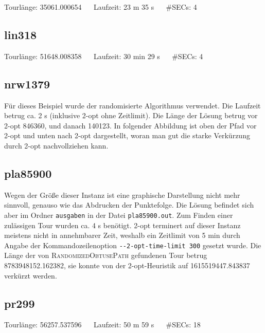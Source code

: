 \documentclass[a4paper, 10pt, ngerman]{article}
\begin{document}
\noindent Tourlänge: 35061.000654 $\quad$ Laufzeit: 23 m 35 s $\quad$ \#SECs: 4 

\subsection{lin318}



\noindent Tourlänge: 51648.008358 $\quad$ Laufzeit: 30 min 29 s $\quad$ \#SECs: 4

\subsection{nrw1379}

Für dieses Beispiel wurde der randomisierte Algorithmus verwendet. Die Laufzeit betrug ca. 2 s (inklusive 2-opt ohne Zeitlimit). Die Länge der Lösung betrug vor 2-opt 846360, und danach 140123. In folgender Abbildung ist oben der Pfad vor 2-opt und unten nach 2-opt dargestellt, woran man gut die starke Verkürzung durch 2-opt nachvollziehen kann.

\noindent 

\noindent 

\subsection{pla85900}

Wegen der Größe dieser Instanz ist eine graphische Darstellung nicht mehr sinnvoll, genauso wie das Abdrucken der Punktefolge. Die Lösung befindet sich aber im Ordner \verb|ausgaben| in der Datei \verb|pla85900.out|. Zum Finden einer zulässigen Tour wurden ca. 4 s benötigt. 2-opt terminert auf dieser Instanz meistens nicht in annehmbarer Zeit, weshalb ein Zeitlimit von 5 min durch Angabe der Kommandozeilenoption \verb|--2-opt-time-limit 300| gesetzt wurde. Die Länge der von \textsc{RandomizedObtusePath} gefundenen Tour betrug 8783948152.162382, sie konnte von der 2-opt-Heuristik auf 1615519447.843837 verkürzt werden.

\subsection{pr299}



\noindent Tourlänge: 56257.537596 $\quad$ Laufzeit: 50 m 59 s $\quad$ \#SECs: 18
\end{document}

